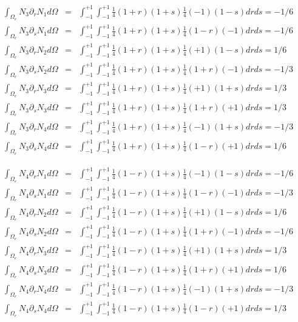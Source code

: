 \begin{tiny}
\begin{eqnarray}
\int_{\Omega_e}  N_3\partial_r N_1 d\Omega&=& \int_{-1}^{+1}\int_{-1}^{+1} \frac{1}{4}(1+r)(1+s) \frac{1}{4}(-1)(1-s) dr ds = -1/6 \\
\int_{\Omega_e}  N_3\partial_s N_1 d\Omega&=& \int_{-1}^{+1}\int_{-1}^{+1} \frac{1}{4}(1+r)(1+s) \frac{1}{4}(1-r)(-1) dr ds = -1/6 \\
\int_{\Omega_e}  N_3\partial_r N_2 d\Omega&=& \int_{-1}^{+1}\int_{-1}^{+1} \frac{1}{4}(1+r)(1+s) \frac{1}{4}(+1)(1-s) dr ds = 1/6\\
\int_{\Omega_e}  N_3\partial_s N_2 d\Omega&=& \int_{-1}^{+1}\int_{-1}^{+1} \frac{1}{4}(1+r)(1+s) \frac{1}{4}(1+r)(-1) dr ds = -1/3\\
\int_{\Omega_e}  N_3\partial_r N_3 d\Omega&=& \int_{-1}^{+1}\int_{-1}^{+1} \frac{1}{4}(1+r)(1+s) \frac{1}{4}(+1)(1+s) dr ds = 1/3 \\
\int_{\Omega_e}  N_3\partial_s N_3 d\Omega&=& \int_{-1}^{+1}\int_{-1}^{+1} \frac{1}{4}(1+r)(1+s) \frac{1}{4}(1+r)(+1) dr ds = 1/3  \\
\int_{\Omega_e}  N_3\partial_r N_4 d\Omega&=& \int_{-1}^{+1}\int_{-1}^{+1} \frac{1}{4}(1+r)(1+s) \frac{1}{4}(-1)(1+s) dr ds = -1/3 \\
\int_{\Omega_e}  N_3\partial_s N_4 d\Omega&=& \int_{-1}^{+1}\int_{-1}^{+1} \frac{1}{4}(1+r)(1+s) \frac{1}{4}(1-r)(+1) dr ds = 1/6 
\end{eqnarray}


\begin{eqnarray}
\int_{\Omega_e}  N_4\partial_r N_1 d\Omega&=& \int_{-1}^{+1}\int_{-1}^{+1} \frac{1}{4}(1-r)(1+s) \frac{1}{4}(-1)(1-s) dr ds = -1/6 \\
\int_{\Omega_e}  N_4\partial_s N_1 d\Omega&=& \int_{-1}^{+1}\int_{-1}^{+1} \frac{1}{4}(1-r)(1+s) \frac{1}{4}(1-r)(-1) dr ds = -1/3 \\
\int_{\Omega_e}  N_4\partial_r N_2 d\Omega&=& \int_{-1}^{+1}\int_{-1}^{+1} \frac{1}{4}(1-r)(1+s) \frac{1}{4}(+1)(1-s) dr ds = 1/6 \\
\int_{\Omega_e}  N_4\partial_s N_2 d\Omega&=& \int_{-1}^{+1}\int_{-1}^{+1} \frac{1}{4}(1-r)(1+s) \frac{1}{4}(1+r)(-1) dr ds = -1/6\\
\int_{\Omega_e}  N_4\partial_r N_3 d\Omega&=& \int_{-1}^{+1}\int_{-1}^{+1} \frac{1}{4}(1-r)(1+s) \frac{1}{4}(+1)(1+s) dr ds =  1/3 \\
\int_{\Omega_e}  N_4\partial_s N_3 d\Omega&=& \int_{-1}^{+1}\int_{-1}^{+1} \frac{1}{4}(1-r)(1+s) \frac{1}{4}(1+r)(+1) dr ds = 1/6  \\
\int_{\Omega_e}  N_4\partial_r N_4 d\Omega&=& \int_{-1}^{+1}\int_{-1}^{+1} \frac{1}{4}(1-r)(1+s) \frac{1}{4}(-1)(1+s) dr ds = -1/3 \\
\int_{\Omega_e}  N_4\partial_s N_4 d\Omega&=& \int_{-1}^{+1}\int_{-1}^{+1} \frac{1}{4}(1-r)(1+s) \frac{1}{4}(1-r)(+1) dr ds = 1/3 
\end{eqnarray}


\end{tiny}

